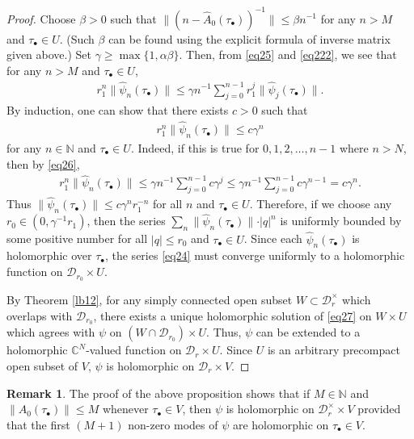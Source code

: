 \documentclass[12pt,b5paper,notitlepage]{report}
\theoremstyle{definition}
\newtheorem{rem}[df]{Remark}
\theoremstyle{plain}
\newcommand{\mc}{\mathcal}
\newcommand{\wht}{\widehat}
\newcommand{\mbb}{\mathbb}
\newcommand{\blt}{\bullet}
\newcommand{\Cbb}{\mathbb C}
\numberwithin{equation}{section}
\begin{document}
\begin{proof}
Choose $\beta>0$ such that  $\lVert (n-\wht A_0(\tau_\blt))^{-1} \lVert\leq \beta n^{-1}$ for any $n> M$ and $\tau_\blt\in U$. (Such $\beta$ can be found using the explicit formula of inverse matrix given above.) Set $\gamma\geq\max\{1,\alpha\beta\}$. Then, from \eqref{eq25} and \eqref{eq222}, we see that for any $n>M$ and $\tau_\blt\in U$,
\begin{align}
r_1^n\lVert \wht\psi_n(\tau_\blt) \lVert\leq \gamma n^{-1}\sum_{j=0}^{n-1}r_1^j\lVert \wht\psi_j(\tau_\blt) \lVert.\label{eq26}
\end{align}
By induction, one can show that there exists $c>0$ such that
\begin{align*}
r_1^n\lVert\wht\psi_n(\tau_\blt)\lVert\leq c\gamma^n 
\end{align*}
for any $n\in\mbb N$ and $\tau_\blt\in U$. Indeed, if this is true for $0,1,2,\dots,n-1$ where $n>N$, then by \eqref{eq26},
\begin{align*}
r_1^n\lVert \wht\psi_n(\tau_\blt) \lVert\leq \gamma n^{-1}\sum_{j=0}^{n-1}c\gamma^j\leq \gamma n^{-1}\sum_{j=0}^{n-1}c\gamma^{n-1}=c\gamma^n.
\end{align*}
Thus $\lVert\wht\psi_n(\tau_\blt)\lVert\leq c\gamma^nr_1^{-n}$ for all $n$ and $\tau_\blt\in U$. Therefore, if we choose any $r_0\in(0,\gamma^{-1}r_1)$, then   the series $\sum_n\lVert \wht \psi_n(\tau_\blt) \lVert \cdot|q|^n$ is uniformly bounded by some positive number for all  $|q|\leq r_0$ and $\tau_\blt\in U$. Since each $\wht\psi_n(\tau_\blt)$ is holomorphic over $\tau_\blt$, the series \eqref{eq24} must converge uniformly to a holomorphic function on $\mc D_{r_0}\times U$. 

By Theorem \ref{lb12}, for any simply connected open subset $W\subset \mc D_r^\times$ which overlaps with $\mc D_{r_0}$, there exists a unique  holomorphic solution of \eqref{eq27} on $W\times U$ which agrees with $\psi$ on $(W\cap\mc D_{r_0})\times U$. Thus, $\psi$ can be extended to a holomorphic $\Cbb^N$-valued function on $\mc D_r\times U$. Since $U$ is an arbitrary precompact open subset of $V$, $\psi$ is holomorphic on $\mc D_r\times V$.
\end{proof}

\begin{rem}\label{lb13}
The proof of the above proposition shows  that if $M\in\mbb N$ and $\lVert\wht A_0(\tau_\blt)\lVert\leq M$ whenever $\tau_\blt\in V$, then $\psi$ is holomorphic  on $\mc D_r^\times \times V$ provided that the first $(M+1)$ non-zero modes of $\psi$ are holomorphic on $\tau_\blt\in V$. 
\end{rem}
\end{document}
